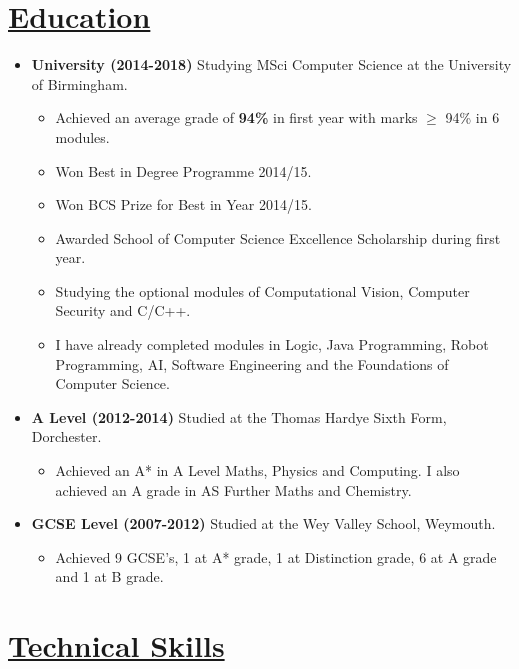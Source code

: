 \documentclass[11pt]{article}
\begin{document}
	\vspace{-30pt}
	\hspace{-100pt}\section*{\underline{Education}}
		\begin {itemize}
			\item \textbf{University (2014-2018)} Studying MSci Computer Science at the University of Birmingham.
				\begin{itemize}
					\item Achieved an average grade of\textbf{ 94\%} in first year with marks $\geq$ 94\% in 6 modules.
					\item Won Best in Degree Programme 2014/15.
					\item Won BCS Prize for Best in Year 2014/15.
					\item Awarded School of Computer Science Excellence Scholarship during first year.
					\item Studying the optional modules of Computational Vision, Computer Security and C/C++.
					\item I have already completed modules in Logic, Java Programming, Robot Programming, AI, Software Engineering and the Foundations of Computer Science.
				\end{itemize}
			\item \textbf{A Level (2012-2014)} Studied at the Thomas Hardye Sixth Form, Dorchester.
				\begin{itemize}
					\item Achieved an A* in A Level Maths, Physics and Computing. I also achieved an A grade in AS Further Maths and Chemistry.
				\end{itemize}
			
			\item \textbf{GCSE Level (2007-2012)}  Studied at the Wey Valley School, Weymouth.
				\begin{itemize}
					\item Achieved 9 GCSE's, 1 at A* grade, 1 at Distinction grade, 6 at A grade and 1 at B grade.
				\end{itemize} 
		\end{itemize}
	\vspace{-20pt}
	\hspace{-100pt}\section*{\underline{Technical Skills}}
\end{document}
